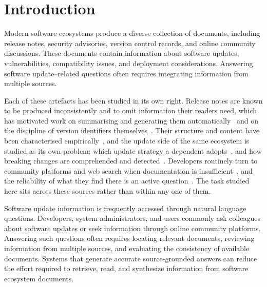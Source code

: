 \documentclass[acmsmall,review,anonymous,screen]{acmart}
\begin{document}


\maketitle

\section{Introduction}\label{sec:intro}

Modern software ecosystems produce a diverse collection of documents, including release notes, security advisories, version control records, and online community discussions. These documents contain information about software updates, vulnerabilities, compatibility issues, and deployment considerations. Answering software update--related questions often requires integrating information from multiple sources.

Each of these artefacts has been studied in its own right. Release notes are known to be produced inconsistently and to omit information their readers need, which has motivated work on summarising and generating them automatically~\cite{abebe2016releasenotes,moreno2017arena,bi2022releasenotes} and on the discipline of version identifiers themselves~\cite{guo2025verlog}.
Their structure and content have been characterised
empirically~\cite{wu2023releasenotes}, and the update side of the same ecosystem
is studied as its own problem: which update strategy a dependent
adopts~\cite{javanjafari2023strategies}, and how breaking changes are
comprehended and detected~\cite{kong2025breaking}. Developers routinely turn to community platforms and web search when documentation is insufficient~\cite{xia2017websearch,zhang2018apimisuse}, and the reliability of what they find there is an active question~\cite{kabir2024stackoverflow,stolee2025codesearch}. The task studied here sits across these sources rather than within any one of them.

Software update information is frequently accessed through natural language questions. Developers, system administrators, and users commonly ask colleagues about software updates or seek information through online community platforms. Answering such questions often requires locating relevant documents, reviewing information from multiple sources, and evaluating the consistency of available documents. Systems that generate accurate source-grounded answers can reduce the effort required to retrieve, read, and synthesize information from software ecosystem documents.
\end{document}

